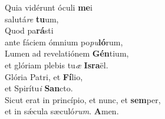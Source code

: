 \evenverse Quia vidérunt óculi \textbf{me}i~\*\\
\evenverse salutá\textit{re} \textbf{tu}um,\\
\oddverse Quod pa\textbf{rá}sti~\*\\
\oddverse ante fáciem ómnium po\textit{pu}\textbf{ló}rum,\\
\evenverse Lumen ad revelatiónem \textbf{Gén}tium,~\*\\
\evenverse et glóriam plebis tu\textit{æ} \textbf{Is}\textbf{ra}ël.\\
\oddverse Glória Patri, et \textbf{Fí}lio,~\*\\
\oddverse et Spirítu\textit{i} \textbf{San}cto.\\
\evenverse Sicut erat in princípio, et nunc, et \textbf{sem}per,~\*\\
\evenverse et in sǽcula sæculó\textit{rum}. \textbf{A}men.\\
